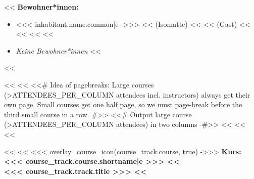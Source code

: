         \setlength{\columnsep}{2cm}
        \begin{minipage}[t]{0.5\textwidth}
            <<%
                {
                    \headingfamily\bfseries Bewohner*innen:
                }
                \begin{itemize}
                    <<%
                        \item <<< inhabitant.name.common|e ->>>
                            <<%
                                { \small (Isomatte)}
                            <<%
                            <<%
                                { \small (Gast)}
                            <<%
                            <<%
                                {} 
                            <<%
                    <<%
                        \item \textit{Keine Bewohner*innen}
                    <<%
                \end{itemize}
            <<%
        \end{minipage}%
        <<%
        <<%
            <<# Idea of pagebreaks: Large courses (>ATTENDEES_PER_COLUMN attendees incl. instructors) always get their
                own page. Small courses get one half page, so we must page-break before the third small course in a row.
                #>>
            <<# Output large course (>ATTENDEES_PER_COLUMN attendees) in two columns -#>>
            <<%
                <<%
                    <<%

                    \pagebreak
                <<%
                <<%
                <<< overlay_course_icon(course_track.course, true) ->>>
                {\headingfamily\bfseries
                    Kurs: <<< course_track.course.shortname|e >>>
                    <<%
                        \\\mdseries
                            <<< course_track.track.title >>>
                    <<%
                    \vspace{0.6\baselineskip}
                }

